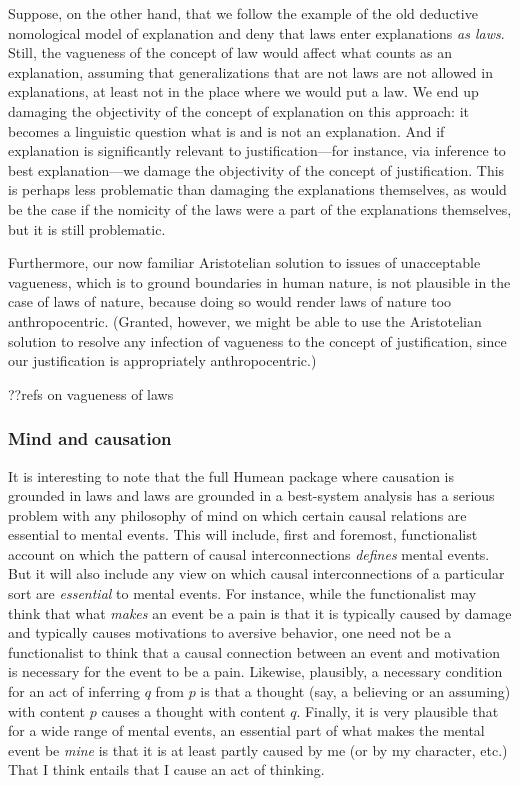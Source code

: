 Suppose, on the other hand, that we follow the example of the old deductive nomological model of explanation and deny that laws 
enter explanations \textit{as laws}. Still, the vagueness of the concept of law would affect what counts as an explanation, assuming that generalizations that
are not laws are not allowed in explanations, at least not in the place where we would put a law. We end up damaging the
objectivity of the concept of explanation on this approach: it becomes a linguistic question what is and is not an explanation. 
And if explanation is significantly relevant to justification---for instance, via inference to best explanation---we damage the 
objectivity of the concept of justification. This is perhaps less problematic than damaging the explanations themselves, as would
be the case if the nomicity of the laws were a part of the explanations themselves, but it is still problematic.

Furthermore, our now familiar Aristotelian solution to issues of unacceptable vagueness, which is to ground boundaries in human nature,
is not plausible in the case of laws of nature, because doing so would render laws of nature too anthropocentric. (Granted,
however, we might be able to use the Aristotelian solution to resolve any infection of vagueness to the concept of justification,
since our justification is appropriately anthropocentric.)

??refs on vagueness of laws

\subsubsection{Mind and causation}
It is interesting to note that the full Humean package where causation is grounded in laws and laws are grounded in a best-system 
analysis has a serious problem with any philosophy of mind on which certain causal relations are essential to mental events. This will
include, first and foremost, functionalist account on which the pattern of causal interconnections \textit{defines} mental events.
But it will also include any view on which causal interconnections of a particular sort are \textit{essential} to mental events.
For instance, while the functionalist may think that what \textit{makes} an event be a pain is that it is typically caused by
damage and typically causes motivations to aversive behavior, one need not be a functionalist to think that a causal connection between 
an event and motivation is necessary for the event to be a pain. Likewise, plausibly, a necessary condition for an act of inferring $q$ 
from $p$ is that a thought (say, a believing or an assuming) with content $p$ causes a thought with content $q$. Finally, it is very
plausible that for a wide range of mental events, an essential part of what makes the mental event be \textit{mine} is that it is 
at least partly caused by me (or by my character, etc.) That I think entails that I cause an act of thinking. 


